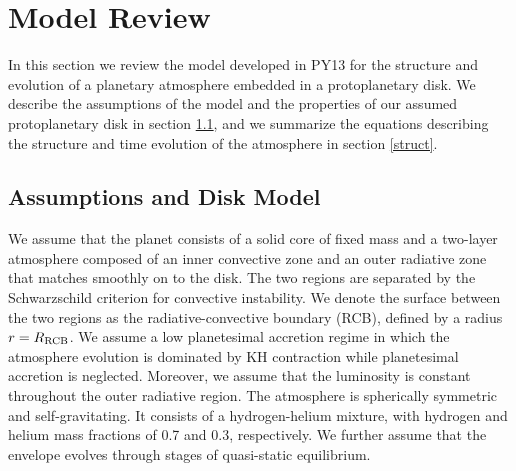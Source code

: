 \documentclass[apj]{emulateapj}
\newcommand{\cb}{_{\rm RCB}}
\begin{document}





\section{Model Review}
\label{sec2}


In this section we review the model developed in PY13 for the structure and evolution of a planetary atmosphere embedded in a protoplanetary disk. We describe the assumptions of the model and the properties of our assumed protoplanetary disk in section \ref{model}, and we summarize the equations describing the structure and time evolution of the atmosphere in section \ref{struct}.  

\subsection{Assumptions and Disk Model}
\label{model}

We assume that the planet consists of a solid core of fixed mass and a two-layer atmosphere composed of an inner convective zone and an outer radiative zone that matches smoothly on to the disk. The two regions are separated by the Schwarzschild criterion for convective instability. We denote the surface between the two regions as the radiative-convective boundary (RCB), defined by a radius $r=R\cb$. We assume a low planetesimal accretion regime in which the atmosphere evolution is dominated by KH contraction while planetesimal accretion is neglected.  Moreover, we assume that the luminosity is constant throughout the outer radiative region. The atmosphere is spherically symmetric and self-gravitating. It consists of a hydrogen-helium mixture, with hydrogen and helium mass fractions of 0.7 and 0.3, respectively. We further assume that the envelope evolves through stages of quasi-static equilibrium. 
\end{document}
